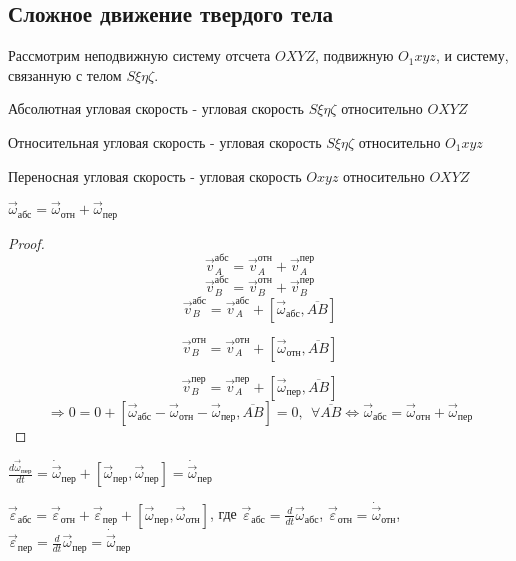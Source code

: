   \subsection{Сложное движение твердого тела}
  Рассмотрим неподвижную систему отсчета $OXYZ$, подвижную $O_1xyz$, и систему, связанную с телом $S\xi\eta\zeta$.
  \begin{df} Абсолютная угловая скорость - угловая скорость $S\xi\eta\zeta$ относительно $OXYZ$\end{df}
  \begin{df} Относительная угловая скорость - угловая скорость $S\xi\eta\zeta$ относительно $O_1xyz$\end{df}
  \begin{df} Переносная угловая скорость - угловая скорость $Oxyz$ относительно $OXYZ$\end{df}  
  \begin{teo} $\vec{\omega}_{\text{абс}} = \vec{\omega}_{\text{отн}} + \vec{\omega}_{\text{пер}}$ \end{teo}
  \begin{proof}
  $$ \vec{v}_A^{\text{абс}} = \vec{v}_A^{\text{отн}} + \vec{v}_A^{\text{пер}} $$
  $$ \vec{v}_B^{\text{абс}} = \vec{v}_B^{\text{отн}} + \vec{v}_B^{\text{пер}} $$
  $$ \vec{v}_B^{\text{абс}} = \vec{v}_A^\text{абс} + [\vec{\omega}_{\text{абс}}, \overline{AB}] $$

  $$ \vec{v}_B^{\text{отн}} = \vec{v}_A^\text{отн} + [\vec{\omega}_{\text{отн}}, \overline{AB}] $$

  $$ \vec{v}_B^{\text{пер}} = \vec{v}_A^\text{пер} + [\vec{\omega}_{\text{пер}}, \overline{AB}] $$
  $$ \Rightarrow 0 = 0 + [\vec{\omega}_{\text{абс}} - \vec{\omega}_{\text{отн}} - \vec{\omega}_{\text{пер}}, \overline{AB}] = 0,~~ \forall \overline{AB} \Leftrightarrow \vec{\omega}_{\text{абс}} = \vec{\omega}_{\text{отн}} + \vec{\omega}_{\text{пер}} $$
  \end{proof}

  \begin{ntc}
  $\frac{d\vec{\omega}_{\text{пер}}}{dt} = \dot{\vec{\omega}}_\text{пер} + [\vec{\omega}_\text{пер}, \vec{\omega}_\text{пер}] = \dot{\vec{\omega}}_\text{пер} $
  \end{ntc}

  \begin{teo} 
  $\vec{\varepsilon}_{\text{абс}} = \vec{\varepsilon}_{\text{отн}} + \vec{\varepsilon}_{\text{пер}} + [\vec{\omega}_{\text{пер}}, \vec{\omega}_\text{отн}]$, где $\vec{\varepsilon}_{\text{абс}} = \frac{d}{dt}\vec{\omega}_{\text{абс}}$, $\vec{\varepsilon}_{\text{отн}} = \dot{\vec{\omega}}_{\text{отн}}$, $\vec{\varepsilon}_{\text{пер}} = \frac{d}{dt}\vec{\omega}_{\text{пер}} = \dot{\vec{\omega}}_{\text{пер}}$
  \end{teo}

